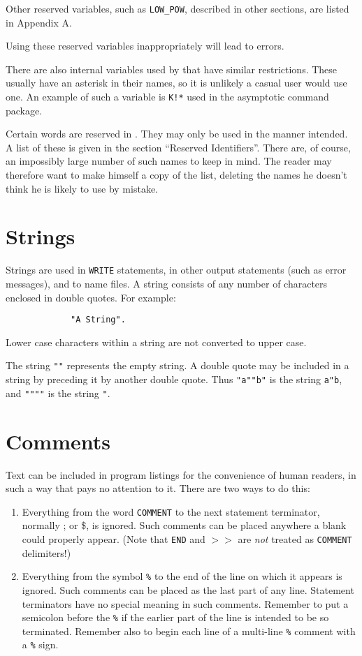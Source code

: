 Other reserved variables, such as {\tt LOW\_POW}, described in other sections,
are listed in Appendix A.

Using these reserved variables inappropriately
will lead to errors.

There are also internal variables used by {\REDUCE} that have similar
restrictions. These usually have an asterisk in their names, so it is
unlikely a casual user would use one. An example of such a variable is
{\tt K!*} used in the asymptotic command package.

Certain words are reserved in {\REDUCE}. They may only be used in the manner
intended. A list of these is given in the section ``Reserved Identifiers''.
There are, of course, an impossibly large number of such names to keep in
mind. The reader may therefore want to make himself a copy of the list,
deleting the names he doesn't think he is likely to use by mistake.

\section{Strings}

Strings are used in {\tt WRITE} statements, in other
output statements (such as error messages), and to name files.  A string
consists of any number of characters enclosed in double quotes.  For example:
\begin{verbatim}
             "A String".
\end{verbatim}
Lower case characters within a string are not converted to upper case.

The string {\tt ""} represents the empty string.  A double quote may be
included in a string by preceding it by another double quote.  Thus
{\tt "a""b"} is the string {\tt a"b}, and {\tt """"} is the string {\tt "}.

\section{Comments}

Text can be included in program listings for the
convenience of human readers, in such a way that {\REDUCE} pays no
attention to it.  There are two ways to do this:

\begin{enumerate}
\item Everything from the word {\tt COMMENT} to the next
statement terminator, normally ; or \$, is ignored.  Such comments
can be placed anywhere a blank could properly appear. (Note that {\tt END}
and $>>$ are {\em not\/} treated as {\tt COMMENT} delimiters!)

\item Everything from the symbol {\tt \%} to the end
of the line on which it appears is ignored.  Such comments can be placed
as the last part of any line.  Statement terminators have no special
meaning in such comments.  Remember to put a semicolon before the {\tt \%}
if the earlier part of the line is intended to be so terminated.  Remember
also to begin each line of a multi-line {\tt \%} comment with a {\tt \%}
sign.
\end{enumerate}

